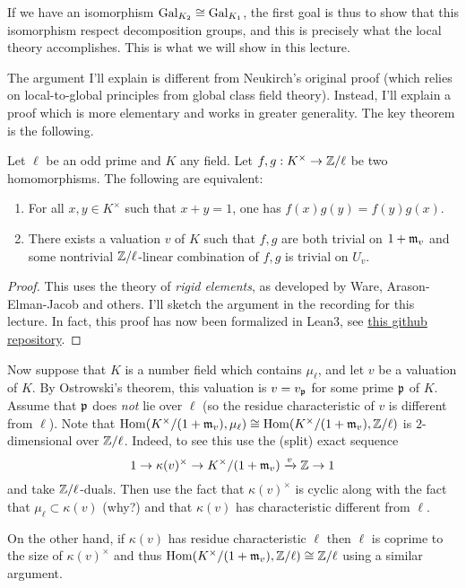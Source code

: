 If we have an isomorphism $\operatorname{Gal}_{K_{2}} \cong \operatorname{Gal}_{K_{1}}$, the first goal is thus to show that this isomorphism respect decomposition groups, and this is precisely what the local theory accomplishes.
This is what we will show in this lecture.

The argument I'll explain is different from Neukirch's original proof (which relies on local-to-global principles from global class field theory).
Instead, I'll explain a proof which is more elementary and works in greater generality.
The key theorem is the following.
\begin{theorem}\label{theorem:localthy}
  Let $\ell$ be an odd prime and $K$ any field.
  Let $f,g : K^{\times} \to \mathbb{Z}/\ell$ be two homomorphisms.
  The following are equivalent:
  \begin{enumerate}
    \item For all $x,y \in K^{\times}$ such that $x + y = 1$, one has $f(x)g(y) = f(y)g(x)$.
    \item There exists a valuation $v$ of $K$ such that $f,g$ are both trivial on $1 + \mathfrak{m}_{v}$ and some nontrivial $\mathbb{Z}/\ell$-linear combination of $f,g$ is trivial on $U_{v}$.
  \end{enumerate}
\end{theorem}
\begin{proof}
  This uses the theory of \emph{rigid elements}, as developed by Ware, Arason-Elman-Jacob and others.
  I'll sketch the argument in the recording for this lecture.
  In fact, this proof has now been formalized in Lean3, see \href{https://github.com/adamtopaz/lean-acl-pairs}{this github repository}.
\end{proof}

Now suppose that $K$ is a number field which contains $\mu_{\ell}$, and let $v$ be a valuation of $K$.
By Ostrowski's theorem, this valuation is $v = v_{\mathfrak{p}}$ for some prime $\mathfrak{p}$ of $K$.
Assume that $\mathfrak{p}$ does \emph{not} lie over $\ell$ (so the residue characteristic of $v$ is different from $\ell$).
Note that $\operatorname{Hom}(K^{\times}/(1+\mathfrak{m}_{v}),\mu_{\ell}) \cong \operatorname{Hom}(K^{\times}/(1+\mathfrak{m}_{v}),\mathbb{Z}/\ell)$ is $2$-dimensional over $\mathbb{Z}/\ell$.
Indeed, to see this use the (split) exact sequence
\[ 1 \to \kappa(v)^{\times} \to K^{\times}/(1+\mathfrak{m}_{v}) \xrightarrow{v} \mathbb{Z} \to 1 \]
and take $\mathbb{Z}/\ell$-duals.
Then use the fact that $\kappa(v)^{\times}$ is cyclic along with the fact that $\mu_{\ell} \subset \kappa(v)$ (why?) and that $\kappa(v)$ has characteristic different from $\ell$.

On the other hand, if $\kappa(v)$ has residue characteristic $\ell$ then $\ell$ is coprime to the size of $\kappa(v)^{\times}$ and thus $\operatorname{Hom}(K^{\times}/(1+\mathfrak{m}_{v}),\mathbb{Z}/\ell) \cong \mathbb{Z}/\ell$ using a similar argument.

